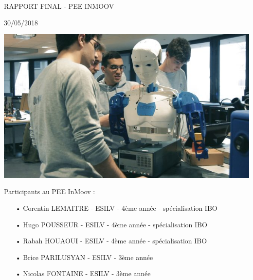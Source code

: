 \documentclass[11pt, oneside]{article}
\newcommand{\type}{30/05/2018}	%
\newcommand{\titre}{Rapport final - PEE InMoov}
\begin{document}
\pagestyle{style}

\begin{center}
\begin{minipage}{0.75\linewidth}
\begin{center}
\centering
   
\vspace{2cm}
\colorbox{gristitle}{
\begin{minipage}{\textwidth}
    \begin{center}
    	\vspace{0.5cm}
    	{\color{bleu} \uppercase{\Huge {\titre}}}
    	\vspace{0.25cm}\linebreak
		\par \color{gris} {\Large \type}	
	\end{center}    
\end{minipage}    
}

\vspace{1cm}
\begin{center}
\includegraphics[width=14cm]{inmoov-robot.jpg}
\end{center}

\vspace{0.5cm}
\color{bleu} {\Large Participants au PEE InMoov  : \par}
\end{center}

\begin{itemize}
\item[•] Corentin LEMAITRE - ESILV - 4ème année - spécialisation IBO
\item[•] Hugo POUSSEUR - ESILV - 4ème année - spécialisation IBO
\item[•] Rabah HOUAOUI - ESILV - 4ème année - spécialisation IBO
\item[•] Brice PARILUSYAN - ESILV - 3ème année
\item[•] Nicolas FONTAINE - ESILV - 3ème année
\end{itemize}

\end{minipage}
\end{center}
\end{document}
